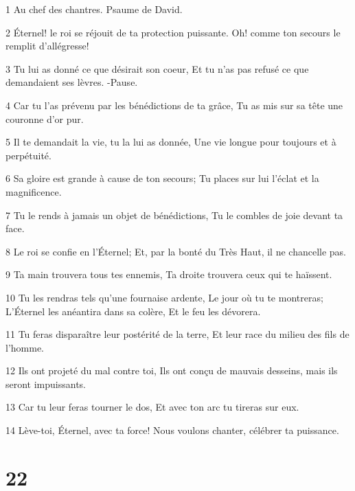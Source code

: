 \par 1 Au chef des chantres. Psaume de David.
\par 2 Éternel! le roi se réjouit de ta protection puissante. Oh! comme ton secours le remplit d'allégresse!
\par 3 Tu lui as donné ce que désirait son coeur, Et tu n'as pas refusé ce que demandaient ses lèvres. -Pause.
\par 4 Car tu l'as prévenu par les bénédictions de ta grâce, Tu as mis sur sa tête une couronne d'or pur.
\par 5 Il te demandait la vie, tu la lui as donnée, Une vie longue pour toujours et à perpétuité.
\par 6 Sa gloire est grande à cause de ton secours; Tu places sur lui l'éclat et la magnificence.
\par 7 Tu le rends à jamais un objet de bénédictions, Tu le combles de joie devant ta face.
\par 8 Le roi se confie en l'Éternel; Et, par la bonté du Très Haut, il ne chancelle pas.
\par 9 Ta main trouvera tous tes ennemis, Ta droite trouvera ceux qui te haïssent.
\par 10 Tu les rendras tels qu'une fournaise ardente, Le jour où tu te montreras; L'Éternel les anéantira dans sa colère, Et le feu les dévorera.
\par 11 Tu feras disparaître leur postérité de la terre, Et leur race du milieu des fils de l'homme.
\par 12 Ils ont projeté du mal contre toi, Ils ont conçu de mauvais desseins, mais ils seront impuissants.
\par 13 Car tu leur feras tourner le dos, Et avec ton arc tu tireras sur eux.
\par 14 Lève-toi, Éternel, avec ta force! Nous voulons chanter, célébrer ta puissance.

\chapter{22}

